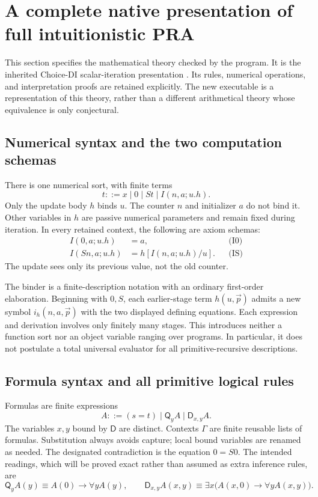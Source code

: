 \documentclass[11pt,letterpaper]{article}
\theoremstyle{definition}\newtheorem{definition}[theorem]{Definition}
\theoremstyle{remark}\newtheorem{remark}[theorem]{Remark}
\newcommand{\D}{\mathsf D}
\newcommand{\Q}{\mathsf Q}
\begin{document}
\section{A complete native presentation of full intuitionistic PRA}
\label{sec:presentation}

This section specifies the mathematical theory checked by the program.
It is the inherited Choice-DI scalar-iteration presentation
\cite{uniform,arity}. Its rules, numerical operations, and interpretation
proofs are retained explicitly. The new executable is a representation
of this theory, rather than a different arithmetical theory whose
equivalence is only conjectural.

\subsection{Numerical syntax and the two computation schemas}

There is one numerical sort, with finite terms
\[
 t ::= x\mid 0\mid St\mid I(n,a;u.h).
\]
Only the update body $h$ binds $u$. The counter $n$ and initializer $a$
do not bind it. Other variables in $h$ are passive numerical parameters
and remain fixed during iteration. In every retained context, the
following are axiom schemas:
\begin{align}
 I(0,a;u.h)&=a, &&\text{(I0)}\label{eq:new-I0}\\
 I(Sn,a;u.h)&=h[I(n,a;u.h)/u]. &&\text{(IS)}\label{eq:new-IS}
\end{align}
The update sees only its previous value, not the old counter.

The binder is a finite-description notation with an ordinary first-order
elaboration. Beginning with $0,S$, each earlier-stage term
$h(u,\vec p)$ admits a new symbol $i_h(n,a,\vec p)$ with the two
displayed defining equations. Each expression and derivation involves
only finitely many stages. This introduces neither a function sort nor
an object variable ranging over programs. In particular, it does not
postulate a total universal evaluator for all primitive-recursive
descriptions.

\subsection{Formula syntax and all primitive logical rules}

Formulas are finite expressions
\[
 A ::= (s=t)\mid \Q_y A\mid\D_{x,y}A.
\]
The variables $x,y$ bound by $\D$ are distinct. Contexts $\Gamma$ are
finite reusable lists of formulas. Substitution always avoids capture;
local bound variables are renamed as needed. The designated
contradiction is the equation $0=S0$. The intended readings, which
will be proved exact rather than assumed as extra inference rules, are
\[
 \Q_y A(y)\equiv A(0)\to\forall y A(y),\qquad
 \D_{x,y}A(x,y)\equiv
 \exists x\bigl(A(x,0)\to\forall y A(x,y)\bigr).
\]
\end{document}
